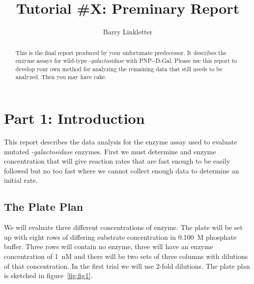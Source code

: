 \documentclass[]{tufte-handout}
\title{Tutorial \#X: Preminary Report}
\author[Barry Linkletter]{Barry Linkletter}
\date{} %
\begin{document}
\justifying


\maketitle%

\begin{abstract}
\noindent This is the final report produced by your unfortunate predecessor. It describes the enzyme assays for wild-type \emph{\textbeta -galactosidase} with PNP-\textbeta-D-Gal. Please use this report to develop your own method for analyzing the remaining data that still needs to be analyzed. Then you may have cake.

\end{abstract}





\section{Part 1: Introduction}

This report describes the data analysis for the enzyme assay used to evaluate mutated \emph{\textbeta -galactosidase} enzymes. First we must determine and enzyme conc\-en\-trat\-ion that will give reaction rates that are fast enough to be easily followed but no too fast where we cannot collect enough data to determine an initial rate. 

\subsection{The Plate Plan}

We will evaluate three different concentrations of enzyme. The plate will be set up with eight rows of differing substrate concentration in \qty{0.100}{M} phosphate buffer. Three rows will contain no enzyme, three will have an enzyme concentration of \qty{1}{nM} and there will be two sets of three columns with dilutions of that concentration. In the first trial we will use 2-fold dilutions. The plate plan is sketched in figure~\ref{fig:fig1}.
\end{document}
